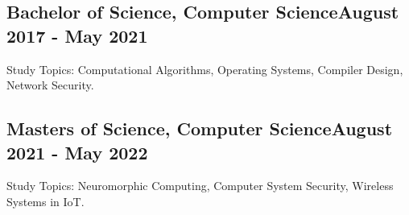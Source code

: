 \vspace*{10pt}
\subsection{{Bachelor of Science, Computer Science}\hfill August 2017 - May 2021}
\vspace*{5pt}
\vspace*{5pt}
Study Topics: Computational Algorithms, Operating Systems, Compiler Design, Network Security.  

\vspace*{8pt}
\subsection{{Masters of Science, Computer Science}\hfill August 2021 - May 2022}
\vspace*{5pt}
\vspace*{5pt}
Study Topics: Neuromorphic Computing, Computer System Security, Wireless Systems in IoT. 
